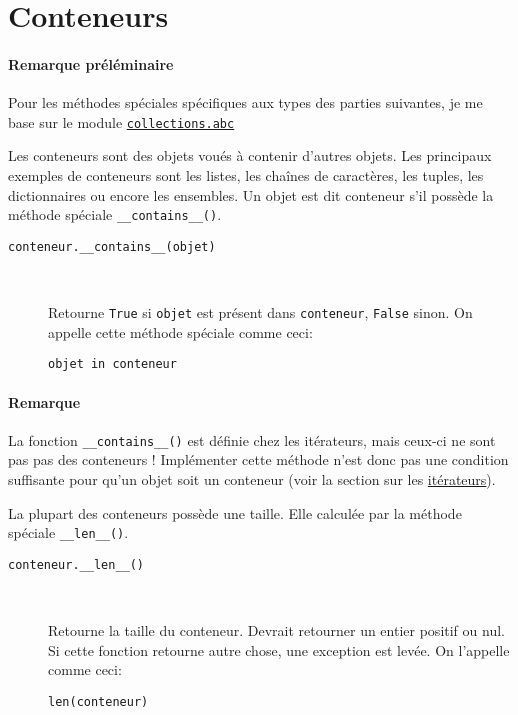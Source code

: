 \section{Conteneurs}

\paragraph{Remarque préléminaire} Pour les méthodes spéciales spécifiques aux types des parties suivantes, je me base sur le module \hyperref[abc]{\texttt{collections.abc}}\bigskip


Les conteneurs sont des objets voués à contenir d'autres objets. Les principaux exemples de conteneurs sont les listes, les chaînes de caractères, les tuples, les dictionnaires ou encore les ensembles. Un objet est dit conteneur s'il possède la méthode spéciale \texttt{__contains__()}.

\begin{description}
    \item[\texttt{conteneur.__contains__(objet)}]~

    Retourne \texttt{True} si \texttt{objet} est présent dans \texttt{conteneur}, \texttt{False} sinon. On appelle cette méthode spéciale comme ceci:
    \begin{verbatim}
objet in conteneur
    \end{verbatim}
\end{description}

\paragraph{Remarque} La fonction \texttt{__contains__()} est définie chez les itérateurs, mais ceux-ci ne sont pas pas des conteneurs ! Implémenter cette méthode n'est donc pas une condition suffisante pour qu'un objet soit un conteneur (voir la section sur les \hyperref[iterateur]{itérateurs}).\bigskip

La plupart des conteneurs possède une taille. Elle calculée par la méthode spéciale \texttt{__len__()}.
\begin{description}
    \item[\texttt{conteneur.__len__()}]~

    Retourne la taille du conteneur. Devrait retourner un entier positif ou nul. Si cette fonction retourne autre chose, une exception est levée. On l'appelle comme ceci:
    \begin{verbatim}
len(conteneur)
    \end{verbatim}
\end{description}
